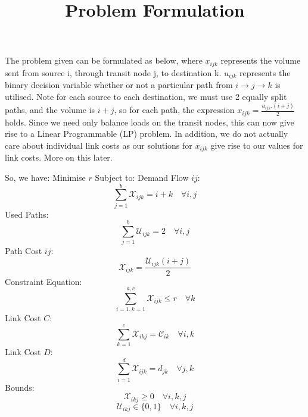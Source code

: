 \documentclass[11pt]{article}
\begin{document}
    \title{Problem Formulation}
    \maketitle

    \paragraph{}
    \noindent
    The problem given can be formulated as below, where $x_{ijk}$ represents the volume sent from source i, through transit
    node j, to destination k. $u_{ijk}$ represents the binary decision variable whether or not a particular path from
    $i \rightarrow j \rightarrow k$ is utilised. Note for each source to each destination, we must use 2 equally
    split paths, and the volume is $i+j$, so for each path, the expression $x_{ijk} = \frac{u_{ijk}.(i+j)}{2}$ holds. Since we
    need only balance loads on the transit nodes, this can now give rise to a Linear Programmable (LP) problem. In addition,
    we do not actually care about individual link costs as our solutions for $x_{ijk}$ give rise to our values for link costs.
    More on this later. \\
    
    \par
    \noindent
    So, we have: \newline
    Minimise $r$ \newline \newline
    Subject to: \newline \newline
    Demand Flow $ij$:
        \[\sum_{j=1}^{b}  \mathcal{X}_{ijk} =  i + k \quad \forall  i, j\] 
    \newline
    Used Paths: \newline
        \[\sum_{j=1}^{b} \mathcal{U}_{ijk} = 2\quad \forall i,j \]
    \newline
    Path Cost \( ij \): \newline
        \[ \mathcal{X}_{ijk} = \frac{\mathcal{U}_{ijk}(i + j)}{2}\]
    \newline
    Constraint Equation: \newline
        \[\sum_{i=1, k=1}^{a, c} \mathcal{X}_{ijk} \leq r \quad \forall k\]
    \newline
    Link Cost $C$:\newline
        \[\sum_{k=1}^{c}\mathcal{X}_{ikj} = \mathcal{C}_{ik} \quad \forall i,k\]
    \newline
    Link Cost $D$:\newline
        \[\sum_{i=1}^{d}\mathcal{X}_{ijk} = d_{jk} \quad \forall j,k\]
    \newline
    Bounds: \newline
        \[\mathcal{X}_{ikj} \geq 0 \quad \forall i,k,j\]\newline
        \[\mathcal{U}_{ikj} \in \{0,1\} \quad \forall i,k,j\] \newline
        
\end{document}

